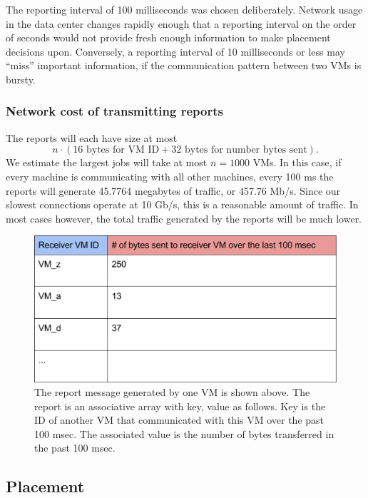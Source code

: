 \documentclass[11pt]{article}
\begin{document}
The reporting interval of 100 milliseconds was chosen deliberately.  Network usage in the data center changes rapidly enough that a reporting interval on the order of seconds would not provide fresh enough information to make placement decisions upon.  Conversely, a reporting interval of 10 milliseconds or less may ``miss'' important information, if the communication pattern between two VMs is bursty.

\subsubsection{Network cost of transmitting reports}
The reports will each have size at most
\[ n \cdot ( 16 \text{ bytes for VM ID} + 32 \text{ bytes for number bytes sent}). \]
We estimate the largest jobs will take at most $n=1000$ VMs.  In this case, if every machine is communicating with all other machines, every 100 ms the reports will generate 45.7764 megabytes of traffic, or 457.76 Mb/s.  Since our slowest connections operate at 10 Gb/s, this is a reasonable amount of traffic.  In most cases however, the total traffic generated by the reports will be much lower.

\begin{figure}
  \centering
\includegraphics[scale=0.45]{measurement.png}

 \caption{The report message generated by one VM is shown above. The report is an associative array with key, value as follows. Key is the ID of another VM that communicated with this VM over the past 100 msec. The associated value is the number of bytes transferred in the past 100 msec.}
 
 \label{fig:report}
\end{figure}

\subsection{Placement}
\end{document}
